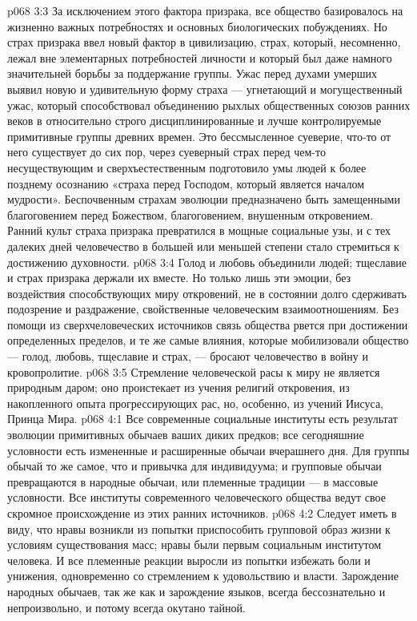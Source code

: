 \vs p068 3:3 За исключением этого фактора призрака, все общество базировалось на жизненно важных потребностях и основных биологических побуждениях. Но страх призрака ввел новый фактор в цивилизацию, страх, который, несомненно, лежал вне элементарных потребностей личности и который был даже намного значительней борьбы за поддержание группы. Ужас перед духами умерших выявил новую и удивительную форму страха --- угнетающий и могущественный ужас, который способствовал объединению рыхлых общественных союзов ранних веков в относительно строго дисциплинированные и лучше контролируемые примитивные группы древних времен. Это бессмысленное суеверие, что\hyp{}то от него существует до сих пор, через суеверный страх перед чем\hyp{}то несуществующим и сверхъестественным подготовило умы людей к более позднему осознанию «страха перед Господом, который является началом мудрости». Беспочвенным страхам эволюции предназначено быть замещенными благоговением перед Божеством, благоговением, внушенным откровением. Ранний культ страха призрака превратился в мощные социальные узы, и с тех далеких дней человечество в большей или меньшей степени стало стремиться к достижению духовности.
\vs p068 3:4 \pc Голод и любовь объединили людей; тщеславие и страх призрака держали их вместе. Но только лишь эти эмоции, без воздействия способствующих миру откровений, не в состоянии долго сдерживать подозрение и раздражение, свойственные человеческим взаимоотношениям. Без помощи из сверхчеловеческих источников связь общества рвется при достижении определенных пределов, и те же самые влияния, которые мобилизовали общество --- голод, любовь, тщеславие и страх, --- бросают человечество в войну и кровопролитие.
\vs p068 3:5 Стремление человеческой расы к миру не является природным даром; оно проистекает из учения религий откровения, из накопленного опыта прогрессирующих рас, но, особенно, из учений Иисуса, Принца Мира.
\vs p068 4:1 Все современные социальные институты есть результат эволюции примитивных обычаев ваших диких предков; все сегодняшние условности есть измененные и расширенные обычаи вчерашнего дня. Для группы обычай то же самое, что и привычка для индивидуума; и групповые обычаи превращаются в народные обычаи, или племенные традиции --- в массовые условности. Все институты современного человеческого общества ведут свое скромное происхождение из этих ранних источников.
\vs p068 4:2 Следует иметь в виду, что нравы возникли из попытки приспособить групповой образ жизни к условиям существования масс; нравы были первым социальным институтом человека. И все племенные реакции выросли из попытки избежать боли и унижения, одновременно со стремлением к удовольствию и власти. Зарождение народных обычаев, так же как и зарождение языков, всегда бессознательно и непроизвольно, и потому всегда окутано тайной.
